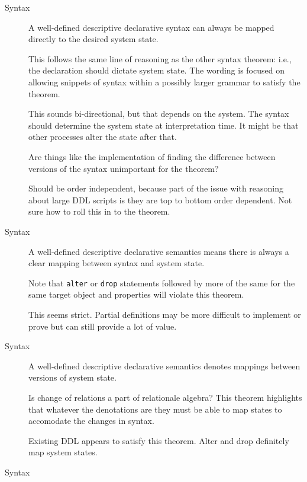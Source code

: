 \documentclass[12pt]{article}
\begin{document}
\begin{description}
  \item[Syntax] A well-defined descriptive declarative syntax can always be mapped directly to the desired system state.

    This follows the same line of reasoning as the other syntax theorem: i.e., the declaration should dictate system state. The wording is focused on allowing snippets of syntax within a possibly larger grammar to satisfy the theorem.

    This sounds bi-directional, but that depends on the system. The syntax should determine the system state at interpretation time. It might be that other processes alter the state after that.

    Are things like the implementation of finding the difference between versions of the syntax unimportant for the theorem?

    Should be order independent, because part of the issue with reasoning about large DDL scripts is they are top to bottom order dependent. Not sure how to roll this in to the theorem.

    \vspace{0.5cm}

  \item[Syntax] A well-defined descriptive declarative semantics means there is always a clear mapping between syntax and system state.

    Note that \verb|alter| or \verb|drop| statements followed by more of the same for the same target object and properties will violate this theorem.

    This seems strict. Partial definitions may be more difficult to implement or prove but can still provide a lot of value.

    \vspace{0.5cm}

  \item[Syntax] A well-defined descriptive declarative semantics denotes mappings between versions of system state.

    Is change of relations a part of relationale algebra? This theorem highlights that whatever the denotations are they must be able to map states to accomodate the changes in syntax.

    Existing DDL appears to satisfy this theorem. Alter and drop definitely map system states.

    \vspace{0.5cm}

  \item[Syntax]


\end{description}
\end{document}
